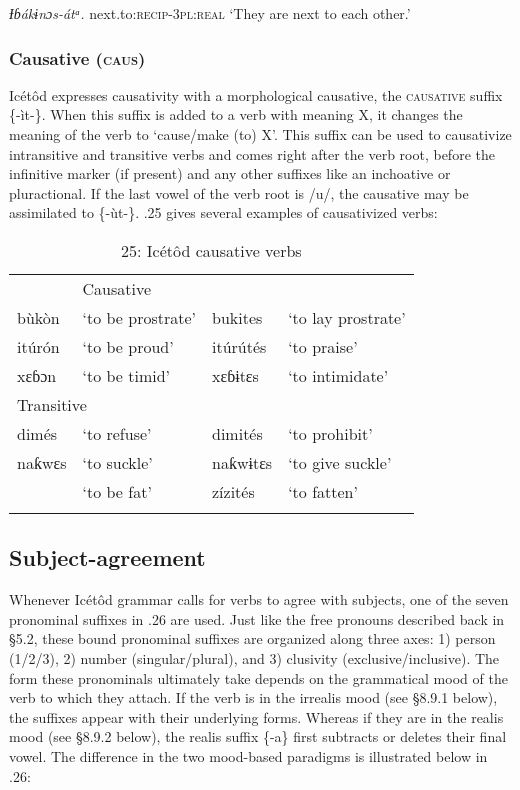 \begin{table}
\textit{Ɨɓák}\textit{ɨnɔs}\textit{{}-átᵃ.}
next.to:\textsc{recip-3pl:real}
‘They are next to each other.’




\subsubsection{Causative (\textsc{caus})}

Icétôd expresses causativity with a morphological causative, the \textsc{causative }suffix \{-ìt-\}. When this suffix is added to a verb with meaning X, it changes the meaning of the verb to ‘cause/make (to) X’. This suffix can be used to causativize intransitive and transitive verbs and comes right after the verb root, before the infinitive marker (if present) and any other suffixes like an inchoative or pluractional. If the last vowel of the verb root is /u/, the causative may be assimilated to \{-ùt-\}. .25 gives several examples of causativized verbs:


\begin{table}
\caption{25: Icétôd causative verbs}
\label{tab:8}


\begin{tabularx}{\textwidth}{XXXX}
\lsptoprule

\multicolumn{2}{X}{Intransitive} & \multicolumn{2}{X}{Causative}\\
bùkòn & ‘to be prostrate’ & bukites & ‘to lay prostrate’\\
itúrón & ‘to be proud’ & itúrútés & ‘to praise’\\
xɛɓɔn & ‘to be timid’ & xɛɓɨtɛs & ‘to intimidate’\\
\multicolumn{2}{X}{Transitive} &  & \\
dimés & ‘to refuse’ & dimités & ‘to prohibit’\\
naƙwɛs & ‘to suckle’ & naƙwɨtɛs & ‘to give suckle’\\ & ‘to be fat’ & zízités & ‘to fatten’\\
\lspbottomrule
\end{tabularx}
\end{table}



\subsection{Subject-agreement}


Whenever Icétôd grammar calls for verbs to agree with subjects, one of the seven pronominal suffixes in .26 are used. Just like the free pronouns described back in §5.2, these bound pronominal suffixes are organized along three axes: 1) person (1/2/3), 2) number (singular/plural), and 3) clusivity (exclusive/inclusive). The form these pronominals ultimately take depends on the grammatical mood of the verb to which they attach. If the verb is in the irrealis mood (see §8.9.1 below), the suffixes appear with their underlying forms. Whereas if they are in the realis mood (see §8.9.2 below), the realis suffix \{-a\} first subtracts or deletes their final vowel. The difference in the two mood-based paradigms is illustrated below in .26:



\end{table}
